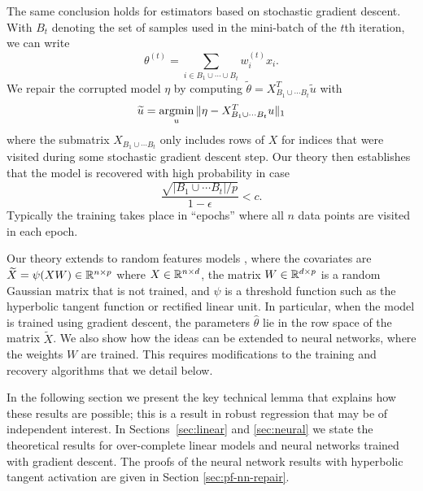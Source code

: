 The same conclusion holds for estimators based on stochastic gradient descent. With $B_t$ denoting the set of samples used in the mini-batch of the $t$th iteration, we can write
\begin{equation}
  \theta^{(t)} = \sum_{i\in B_1\cup\cdots\cup B_t} w_i^{(t)} x_i.
\end{equation}
We repair the corrupted model $\eta$ by computing $\tilde \theta = X^T_{B_1\cup \cdots B_t} \tilde u$ with
\begin{equation}
  \tilde u = \argmin_u \| \eta - X^T_{B_1\cup \cdots B_t} u\|_1
\end{equation}
where the submatrix $X_{B_1\cup\cdots B_t}$ only includes rows of $X$ for indices that were visited during some stochastic
gradient descent step. Our theory then establishes that the model is recovered with high probability in case
\begin{equation}
  \frac{\sqrt{{|B_1 \cup \cdots B_t|}/{p}}}{1-\epsilon} < c.
\end{equation}
Typically the training takes place in ``epochs'' where all $n$ data points are visited in each epoch.

 Our theory extends to random features models \citep{rahimi2008}, where the covariates are $\widetilde X = \psi(X W)\in \mathbb{R}^{n\times p}$ where $X\in\mathbb{R}^{n\times d}$, the matrix $W\in\mathbb{R}^{d\times p}$ is a random Gaussian matrix that is not trained, and $\psi$ is a threshold function such as the hyperbolic tangent function or rectified linear unit. In particular, when the model is trained using gradient descent, the parameters $\hat\theta$ lie in the row
space of the matrix $\tilde X$. We also show how the ideas can be extended to neural networks, where the weights $W$ are trained. This requires modifications to the training and recovery algorithms that we detail below.

In the following section we present the key technical lemma that explains how these results are possible; this is a result in robust regression that may be of independent interest. In Sections~\ref{sec:linear} and \ref{sec:neural} we state the theoretical results for over-complete linear models and neural networks trained with gradient descent. The proofs of the neural network results with hyperbolic tangent activation are given in Section \ref{sec:pf-nn-repair}.
